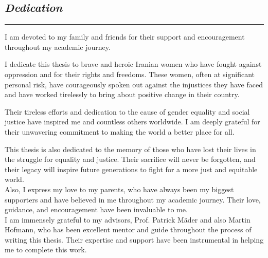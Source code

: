\begin{center}
    \subsection*{\textit{Dedication}}

    \rule{\linewidth}{0.5pt}

    {\selectfont
        I am devoted to my family and friends for their support and encouragement throughout my academic journey.

        I dedicate this thesis to brave and heroic Iranian women who have fought against oppression and for their rights and freedoms. These women, often at significant personal risk, have courageously spoken out against the injustices they have faced and have worked tirelessly to bring about positive change in their country.

        Their tireless efforts and dedication to the cause of gender equality and social justice have inspired me and countless others worldwide. I am deeply grateful for their unwavering commitment to making the world a better place for all.

        This thesis is also dedicated to the memory of those who have lost their lives in the struggle for equality and justice. Their sacrifice will never be forgotten, and their legacy will inspire future generations to fight for a more just and equitable world.
        \\\vspace{1cm}
        Also, I express my love to my parents, who have always been my biggest supporters and have believed in me throughout my academic journey. Their love, guidance, and encouragement have been invaluable to me.
        \\\vspace{1cm}
        I am immensely grateful to my advisors, Prof. Patrick Mäder and also Martin Hofmann, who has been excellent mentor and guide throughout the process of writing this thesis. Their expertise and support have been instrumental in helping me to complete this work.
    }

\end{center}
\normalfont

\newpage